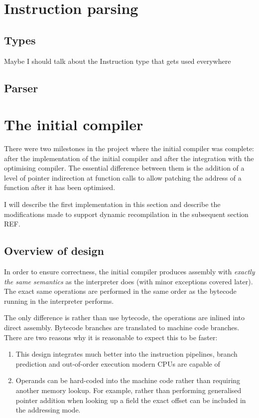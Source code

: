 \section{Instruction parsing}

\subsection{Types}

Maybe I should talk about the Instruction type that gets used everywhere

\subsection{Parser}

\section{The initial compiler}

There were two milestones in the project where the initial compiler was complete: after the
implementation of the initial compiler and after the integration with the optimising compiler. The
essential difference between them is the addition of a level of pointer indirection at function
calls to allow patching the address of a function after it has been optimised.

I will describe the first implementation in this section and describe the modifications made to
support dynamic recompilation in the subsequent section REF.

\subsection{Overview of design}

In order to ensure correctness, the initial compiler produces assembly with \emph{exactly the same
    semantics} as the interpreter does (with minor exceptions covered later). The exact same
operations
are performed in the same order as the bytecode running in the interpreter performs.

The only difference is rather than use bytecode, the operations are inlined into direct assembly.
Bytecode branches are translated to machine code branches. There are two reasons why it is
reasonable to expect this to be faster:

\begin{enumerate}
    \item This design integrates much better into the instruction pipelines, branch prediction and
          out-of-order execution modern CPUs are capable of
    \item Operands can be hard-coded into the machine code rather than requiring another memory
          lookup. For example, rather than performing generalised pointer addition when looking up
          a field
          the exact offset can be included in the addressing mode.
\end{enumerate}

